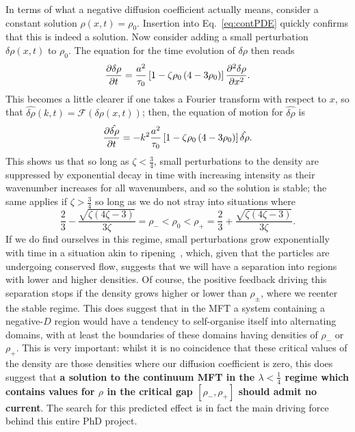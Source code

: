 In terms of what a negative diffusion coefficient actually means, consider a constant solution $\rho(x, t) = \rho_0$. Insertion into Eq.~\eqref{eq:contPDE} quickly confirms that this is indeed a solution. Now consider adding a small
perturbation $\delta\rho (x, t)$ to $\rho_0$. The equation for the time evolution of $\delta \rho$ then reads
\begin{equation}
 \frac{\partial \delta\rho}{\partial t} = \frac{a^2}{\tau_0} \left[1 - \zeta \rho_0\left(4-3\rho_0\right) \right] \frac{\partial ^2 \delta \rho}{\partial x^2}.
\end{equation}
This becomes a little clearer if one takes a Fourier transform with respect to $x$, so that $\hat{\delta \rho} (k, t) = \mathcal{F}(\delta \rho(x, t))$; then, the equation of motion for $\hat{\delta \rho}$ is
\begin{equation}
 \frac{\partial \hat{\delta \rho}}{\partial t} = - k^2 \frac{a^2}{\tau_0} \left[1 - \zeta \rho_0\left(4-3\rho_0\right) \right] \hat{\delta \rho}.
\end{equation}
This shows us that so long as $\zeta<\frac{3}{4}$, small perturbations to the density are suppressed by exponential decay in time with increasing intensity as their wavenumber increases for all wavenumbers,
and so the solution is stable; the same applies if $\zeta>\frac{3}{4}$ so long as we do not stray into situations where
\begin{equation}
\label{eq:rhoPmDefn}
\frac{2}{3} - \frac{\sqrt{\zeta(4\zeta-3)}}{3\zeta} = \rho_- < \rho_0 < \rho_+ = \frac{2}{3} + \frac{\sqrt{\zeta(4\zeta-3)}}{3\zeta}.
\end{equation}
If we do find ourselves in this regime, small perturbations grow exponentially with time in a situation akin to ripening~\cite{voorhees1985},
which, given that the particles are undergoing conserved flow, suggests that we will have a separation into regions with lower and higher
densities. Of course, the positive feedback driving this separation stops if the density grows higher or lower than $\rho_\pm$, where we reenter the stable regime. This does suggest that in the MFT a system containing a negative-$D$
region would have a tendency to self-organise itself into alternating domains, with at least the boundaries of these domains having densities of $\rho_-$ or $\rho_+$. This is very important: whilst it is no coincidence that these
critical values of the density are those densities where our diffusion coefficient is zero, this does suggest that \textbf{a solution to the continuum MFT in the $\lambda<\frac{1}{4}$ regime  which contains values for $\rho$
in the critical gap $[\rho_-, \rho_+]$ should admit no current}. The search for this predicted effect is in fact the main driving force behind this entire PhD project.



